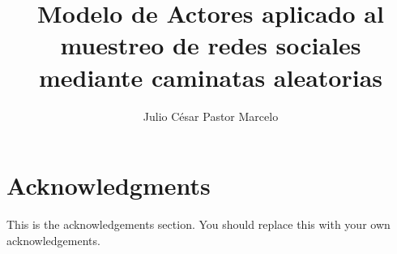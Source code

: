 \title{Modelo de Actores aplicado al muestreo de redes sociales mediante caminatas aleatorias}
\author{Julio C\'esar Pastor Marcelo}









\maketitle

\cleardoublepage

\setcounter{savepage}{\thepage}
\begin{abstractpage}
  
\end{abstractpage}

\cleardoublepage
\section*{Acknowledgments}
This is the acknowledgements section.  You should replace this with your
own acknowledgements.



  
